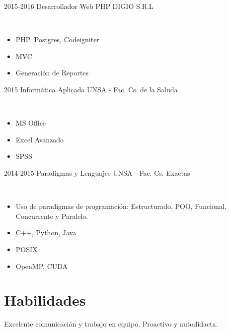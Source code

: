 \documentclass[]{cv-style}          %
\begin{document}
\begin{entrylist}
\entry
  {2015-2016}
  {Desarrollador Web PHP}
  {DIGIO S.R.L}
  {\\ 
  \begin{itemize}
    \item PHP, Postgres, Codeigniter
    \item MVC
    \item Generación de Reportes
  \end{itemize}}
  
 \entry
  {2015}
  {Informática Aplicada}
  {UNSA - Fac. Cs. de la Saluda}
  {\\ 
  \begin{itemize}
    \item MS Office
    \item Excel Avanzado
    \item SPSS
  \end{itemize}}
  
\entry
  {2014-2015}
  {Paradigmas y Lenguajes }
  {UNSA - Fac. Cs. Exactas}
  {\\ 
  \begin{itemize}
    \item Uso de paradigmas de programación: Estructurado, POO, Funcional, Concurrente y Paralelo.
    \item C++, Python, Java
    \item POSIX
    \item OpenMP, CUDA
  \end{itemize}}



\end{entrylist}



\section{Habilidades}
  \vspace{-0.2cm}

Excelente comunicación y trabajo en equipo. Proactivo y autodidacta. 
\end{document}
